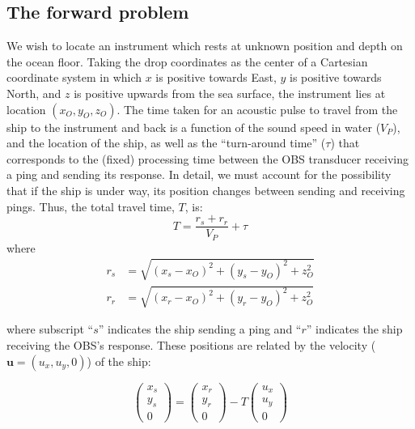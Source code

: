 

\subsection{The forward problem}

We wish to locate an instrument which rests at unknown position and depth on the ocean floor. Taking the drop coordinates as the center of a Cartesian coordinate system in which $x$ is positive towards East, $y$ is positive towards North, and $z$ is positive upwards from the sea surface, the instrument lies at location $(x_O,y_O,z_O)$. The time taken for an acoustic pulse to travel from the ship to the instrument and back is a function of the sound speed in water ($V_P$), and the location of the ship, as well as the ``turn-around time'' ($\tau$) that corresponds to the (fixed) processing time between the OBS transducer receiving a ping and sending its response. In detail, we must account for the possibility that if the ship is under way, its position changes between sending and receiving pings. Thus, the total travel time, $T$, is:
\begin{equation}
T = \frac{r_s + r_r}{V_P} + \tau \label{eq:forward_send_receive}
\end{equation}
where
\begin{align}
	r_s &= \sqrt{(x_s - x_O)^2 + (y_s - y_O)^2 + z_O^2}\\
	r_r &= \sqrt{(x_r - x_O)^2 + (y_r - y_O)^2 + z_O^2}
\end{align}

where subscript ``$s$'' indicates the ship sending a ping and ``$r$'' indicates the ship receiving the OBS's response. These positions are related by the velocity ($\mathbf{u} = (u_x,u_y,0)$) of the ship:

\begin{equation}
\begin{pmatrix} x_s\\y_s\\0 \end{pmatrix} = \begin{pmatrix} x_r\\y_r\\0 \end{pmatrix} - T\begin{pmatrix} u_x\\u_y\\0 \end{pmatrix}
\end{equation}


